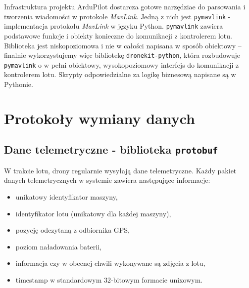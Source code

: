 Infrastruktura projektu ArduPilot dostarcza gotowe narzędziae do
parsowania i tworzenia wiadomości w protokole \textit{MavLink}.
Jedną z nich jest \texttt{pymavlink} - implementacja protokołu \textit{MavLink} 
w języku Python. \texttt{pymavlink} zawiera podstawowe funkcje i obiekty konieczne
do komunikacji z kontrolerem lotu. Biblioteka jest niskopoziomowa i nie w całości
napisana w sposób obiektowy -- finalnie wykorzystujemy więc bibliotekę
\texttt{dronekit-python}\cite{dronekit_python}, która rozbudowuje \texttt{pymavlink}
o w pełni obiektowy, wysokopoziomowy interfejs do komunikacji z kontrolerem lotu. 
Skrypty odpowiedzialne za logikę biznesową napisane są w Pythonie.

\section{Protokoły wymiany danych}

\subsection{Dane telemetryczne - biblioteka \texttt{protobuf}} \label{protobuf_chapter}


W trakcie lotu, drony regularnie wysyłają dane telemetryczne. Każdy pakiet
danych telemetrycznych w systemie zawiera następujące informacje:
\begin{itemize}
	\item unikatowy identyfikator maszyny,
	\item identyfikator lotu (unikatowy dla każdej maszyny),
	\item pozycję odczytaną z odbiornika GPS,
	\item poziom naładowania baterii,
	\item informacja czy w obecnej chwili wykonywane są zdjęcia z lotu,
	\item timestamp w standardowym 32-bitowym formacie unixowym.
\end{itemize}

